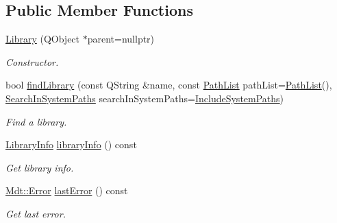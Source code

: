 \subsection*{Public Member Functions}
\begin{DoxyCompactItemize}
\item 
\hyperlink{class_mdt_1_1_deploy_utils_1_1_library_ae3d859ad862e026b00d12e50702ae4df}{Library} (Q\+Object $\ast$parent=nullptr)\hypertarget{class_mdt_1_1_deploy_utils_1_1_library_ae3d859ad862e026b00d12e50702ae4df}{}\label{class_mdt_1_1_deploy_utils_1_1_library_ae3d859ad862e026b00d12e50702ae4df}

\begin{DoxyCompactList}\small\item\em Constructor. \end{DoxyCompactList}\item 
bool \hyperlink{class_mdt_1_1_deploy_utils_1_1_library_afeac04ff3404387fc542347849bffeb4}{find\+Library} (const Q\+String \&name, const \hyperlink{class_mdt_1_1_deploy_utils_1_1_path_list}{Path\+List} path\+List=\hyperlink{class_mdt_1_1_deploy_utils_1_1_path_list}{Path\+List}(), \hyperlink{class_mdt_1_1_deploy_utils_1_1_library_ab9f58dba8290dd1882a21d73cc7c10d0}{Search\+In\+System\+Paths} search\+In\+System\+Paths=\hyperlink{class_mdt_1_1_deploy_utils_1_1_library_ab9f58dba8290dd1882a21d73cc7c10d0adabc8cd036aa884536c359cc3a2783ca}{Include\+System\+Paths})
\begin{DoxyCompactList}\small\item\em Find a library. \end{DoxyCompactList}\item 
\hyperlink{class_mdt_1_1_deploy_utils_1_1_library_info}{Library\+Info} \hyperlink{class_mdt_1_1_deploy_utils_1_1_library_a8b272e0c638aa2949b5f19b3c75ed9ae}{library\+Info} () const 
\begin{DoxyCompactList}\small\item\em Get library info. \end{DoxyCompactList}\item 
\hyperlink{class_mdt_1_1_error}{Mdt\+::\+Error} \hyperlink{class_mdt_1_1_deploy_utils_1_1_library_adb9bf35bba0d23731ac97d40fc5fe91d}{last\+Error} () const \hypertarget{class_mdt_1_1_deploy_utils_1_1_library_adb9bf35bba0d23731ac97d40fc5fe91d}{}\label{class_mdt_1_1_deploy_utils_1_1_library_adb9bf35bba0d23731ac97d40fc5fe91d}

\begin{DoxyCompactList}\small\item\em Get last error. \end{DoxyCompactList}\end{DoxyCompactItemize}


